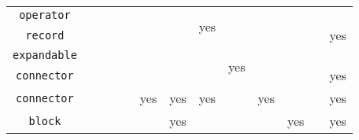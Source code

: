 \begin{center}
{\begin{tabular}{|c||c|c|c|c|c|c|c|c|c|c|c|c|}
    \hline
    \lstinline!operator!          &                          &                           &                                            &                      &                          &                          & \multirow{2}{*}{yes}     &                          &                            &                          &                        & \cellcolor{lightgray}                      \\
    \lstinline!record!            &                          &                           &                                            &                      &                          &                          &                          &                          &                            &                          &                        & \multirow{-2}{*}{\cellcolor{lightgray}yes} \\
    \hline
    \lstinline!expandable!        &                          &                           &                                            &                      &                          &                          &                          & \multirow{2}{*}{yes}     &                            &                          &                        & \cellcolor{lightgray}                      \\
    \lstinline!connector!         &                          &                           &                                            &                      &                          &                          &                          &                          &                            &                          &                        & \multirow{-2}{*}{\cellcolor{lightgray}yes} \\
    \hline
    \lstinline!connector!         &                          &                           &                                            &                      & \cellcolor{lightgray}yes & \cellcolor{lightgray}yes & \cellcolor{lightgray}yes &                          & yes                        &                          &                        & \cellcolor{lightgray}yes                   \\
    \hline
    \lstinline!block!             &                          &                           &                                            &                      &                          & \cellcolor{lightgray}yes &                          &                          &                            & yes                      &                        & \cellcolor{lightgray}yes                   \\

\end{tabular}}
\end{center}
